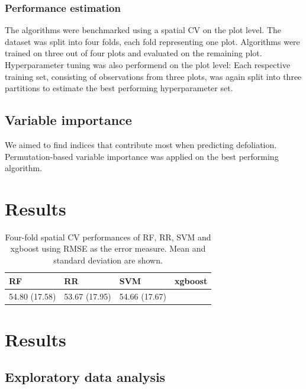 \documentclass[review]{elsarticle}
\begin{document}
\subsubsection{Performance estimation}

The algorithms were benchmarked using a spatial \ac{CV} on the plot level.
The dataset was split into four folds, each fold representing one plot.
Algorithms were trained on three out of four plots and evaluated on the remaining plot.
Hyperparameter tuning was also performend on the plot level: Each respective training set, consisting of observations from three plots, was again split into three partitions to estimate the best performing hyperparameter set.


\subsection{Variable importance}

We aimed to find indices that contribute most when predicting defoliation.
Permutation-based variable importance was applied on the best performing algorithm.



\section{Results}

\begin{table}[b!]
\centering
\caption[t]{Four-fold spatial \ac{CV} performances of RF, RR, SVM and xgboost using \ac{RMSE} as the error measure. 
Mean and standard deviation are shown.}
\begingroup\footnotesize
\begin{tabular}{llll}
	\\
	RF            & RR            & SVM           & xgboost \\
	\hline
	54.80 (17.58) & 53.67 (17.95) & 54.66 (17.67) &         \\
	\bottomrule
\end{tabular}
\endgroup
\label{tab:penalty_comparison}
\end{table}

\section{Results}

\subsection{Exploratory data analysis}
\end{document}
